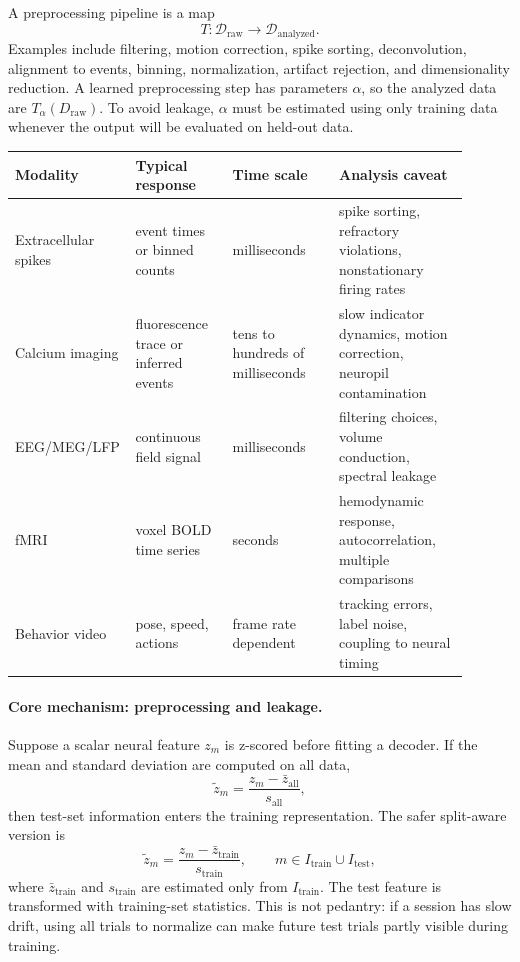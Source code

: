 A preprocessing pipeline is a map
\[
T:\mathcal D_{\mathrm{raw}}\to\mathcal D_{\mathrm{analyzed}}.
\]
Examples include filtering, motion correction, spike sorting, deconvolution, alignment to events, binning, normalization, artifact rejection, and dimensionality reduction. A learned preprocessing step has parameters \(\alpha\), so the analyzed data are \(T_\alpha(D_{\mathrm{raw}})\). To avoid leakage, \(\alpha\) must be estimated using only training data whenever the output will be evaluated on held-out data.

\begin{center}
\small
\renewcommand{\arraystretch}{1.18}
\begin{tabular}{p{0.17\linewidth}p{0.21\linewidth}p{0.23\linewidth}p{0.29\linewidth}}
\toprule
Modality & Typical response & Time scale & Analysis caveat \\
\midrule
Extracellular spikes & event times or binned counts & milliseconds & spike sorting, refractory violations, nonstationary firing rates \\
Calcium imaging & fluorescence trace or inferred events & tens to hundreds of milliseconds & slow indicator dynamics, motion correction, neuropil contamination \\
EEG/MEG/LFP & continuous field signal & milliseconds & filtering choices, volume conduction, spectral leakage \\
fMRI & voxel BOLD time series & seconds & hemodynamic response, autocorrelation, multiple comparisons \\
Behavior video & pose, speed, actions & frame rate dependent & tracking errors, label noise, coupling to neural timing \\
\bottomrule
\end{tabular}
\end{center}

\paragraph{Core mechanism: preprocessing and leakage.}
Suppose a scalar neural feature \(z_m\) is z-scored before fitting a decoder. If the mean and standard deviation are computed on all data,
\[
\tilde z_m=\frac{z_m-\bar z_{\mathrm{all}}}{s_{\mathrm{all}}},
\]
then test-set information enters the training representation. The safer split-aware version is
\[
\tilde z_m=
\frac{z_m-\bar z_{\mathrm{train}}}{s_{\mathrm{train}}},
\qquad m\in I_{\mathrm{train}}\cup I_{\mathrm{test}},
\]
where \(\bar z_{\mathrm{train}}\) and \(s_{\mathrm{train}}\) are estimated only from \(I_{\mathrm{train}}\). The test feature is transformed with training-set statistics. This is not pedantry: if a session has slow drift, using all trials to normalize can make future test trials partly visible during training.

